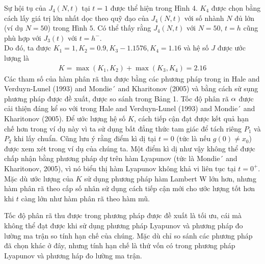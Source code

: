 \begin{vd}
Sự hội tụ của $J_4(N,t)$ tại $t =1$ được thể hiện trong Hình 4. $K_4$ được chọn bằng cách lấy giá trị lớn nhất dọc theo quỹ đạo của $J_4(N,t)$ với số nhành $N$ đủ lớn (ví dụ $N = 50$) trong Hình $5$. Có thể thấy rằng $J_4(N,t)$ với $N = 50$, $t =h$ cũng phù 
hợp với $J_3(t)$ với $t = h^-$.\\
Do đó, ta được $K_1 =1, K_2=0.9, K_3 - 1.1576, K_4 = 1.16$ và hệ số $J$ được ước lượng là
\begin{align*}
	K = \max(K_1,K_2) + \max(K_3,K_4) = 2.16
\end{align*}
Các tham số của hàm phân rã thu được bằng các phương pháp trong in Hale and Verduyn-Lunel (1993) and Mondie´ and Kharitonov (2005) và bằng cách sử sụng phương pháp được đề xuất, được so sánh trong Bảng 1. Tốc độ phân rã $\alpha$ được cải thiện đáng kể so với trong Hale and Verduyn-Lunel (1993) and Mondie´ and Kharitonov (2005). Để ước lượng hệ số $K$, cách tiếp cận đạt được kết quả hạn chế hơn trong ví dụ này vì ta sử dụng bất đẳng thức tam giác để tách riêng $P_1$ và $P_2$ khi lấy chuẩn. Cũng lưu ý rằng điểm kì dị tại $t=0$ (tức là nếu $g(0) \ne x_0$) được xem xét trong ví dụ của chúng ta. Một điểm kì dị như vậy không thể được chấp nhận bằng phương pháp dự trên hàm Lyapunov (tức là Mondie´ and Kharitonov, 2005), vì nó biểu thị hàm Lyapunov không khả vi liên tục tại $ t = 0^+$. Mặc dù ước lượng của $K$ sử dụng phương pháp hàm Lambert W lớn hơn, nhưng hàm phân rã theo cấp số nhân sử dụng cách tiếp cận mới cho ước lượng tốt hơn khi $t$ càng lớn như hàm phân rã theo hàm mũ.
\end{vd}
\begin{nx}
	Tốc độ phân rã thu được trong phương pháp được đề xuất là tối ưu, cái mà không thể đạt được khi sử dụng phương pháp Lyapunov và phương pháp đo lường ma trận so tính hạn chế  của chúng. Mặc dù chỉ so sánh các phương pháp đã chọn khác ở đây, nhưng tính hạn chế  là thứ vốn có trong phương pháp Lyapunov và phương háp đo lường ma trận. 
\end{nx}
